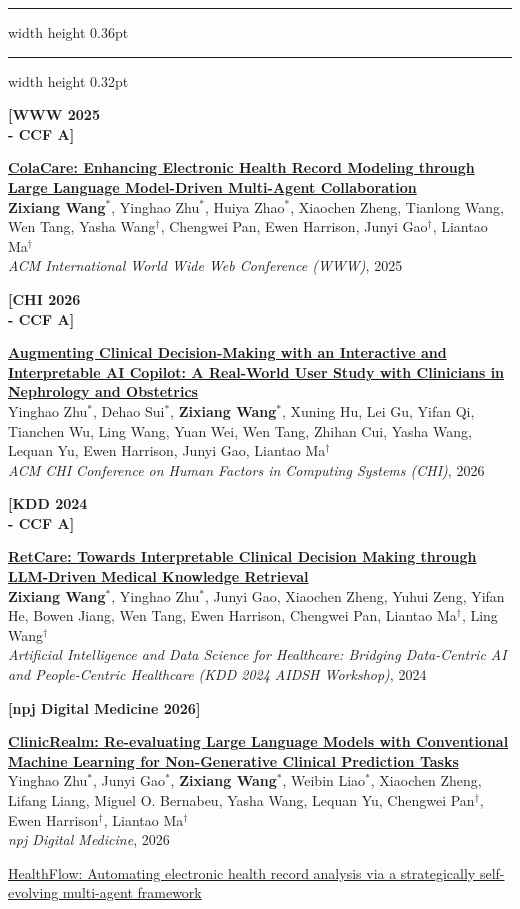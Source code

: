 \documentclass[10pt,a4paper]{article}
\newlength{\pubcategorywidth}
\newcommand{\sectiontitle}[1]{%
    \par\vspace{2.6mm}%
    \noindent{\Large\textbf{#1}}\par
    \vspace{0.9mm}%
    \hrule width \textwidth height 0.36pt
    \vspace{1.85mm}%
}
\newcommand{\pubcategorytitle}[1]{%
    \par\vspace{1.2mm}%
    \settowidth{\pubcategorywidth}{{\normalsize\textbf{#1}}}%
    \noindent{\normalsize\textcolor{darkred}{\textbf{#1}}}\par
    \vspace{0.45mm}%
    {\color{darkred}\hrule width \pubcategorywidth height 0.32pt}
    \vspace{1.45mm}%
}
\newcommand{\pubentry}[5]{
    \noindent
    \begin{minipage}[t]{0.145\textwidth}
    \raggedright\small\textbf{#1}
    \end{minipage}
    \hfill
    \begin{minipage}[t]{0.84\textwidth}
    {\small\textbf{\textcolor{black}{#2}}}\\[-0.1mm]
    {\small #3}\\[-0.1mm]
    {\small\textit{#4}, #5}
    \end{minipage}
    \par\vspace{1.35mm}
}
\begin{document}
\sectiontitle{论文发表 {\normalfont\small ($^{\ast}$ 表示共同一作；$^{\dagger}$ 表示通讯作者)}}
\pubcategorytitle{Core Works}
\pubentry{[WWW 2025\\[-0.1mm]- CCF A]}
{\begingroup\hypersetup{hidelinks}\href{https://dl.acm.org/doi/10.1145/3696410.3714877}{ColaCare: Enhancing Electronic Health Record Modeling through Large Language Model-Driven Multi-Agent Collaboration}\endgroup}
{\textbf{Zixiang Wang}$^{\ast}$, Yinghao Zhu$^{\ast}$, Huiya Zhao$^{\ast}$, Xiaochen Zheng, Tianlong Wang, Wen Tang, Yasha Wang$^{\dagger}$, Chengwei Pan, Ewen Harrison, Junyi Gao$^{\dagger}$, Liantao Ma$^{\dagger}$}
{ACM International World Wide Web Conference (WWW)}
{2025}
\pubentry{[CHI 2026\\[-0.1mm]- CCF A]}
{\begingroup\hypersetup{hidelinks}\href{https://arxiv.org/abs/2602.00726}{Augmenting Clinical Decision-Making with an Interactive and Interpretable AI Copilot: A Real-World User Study with Clinicians in Nephrology and Obstetrics}\endgroup}
{Yinghao Zhu$^{\ast}$, Dehao Sui$^{\ast}$, \textbf{Zixiang Wang}$^{\ast}$, Xuning Hu, Lei Gu, Yifan Qi, Tianchen Wu, Ling Wang, Yuan Wei, Wen Tang, Zhihan Cui, Yasha Wang, Lequan Yu, Ewen Harrison, Junyi Gao, Liantao Ma$^{\dagger}$}
{ACM CHI Conference on Human Factors in Computing Systems (CHI)}
{2026}
\pubentry{[KDD 2024\\[-0.1mm]- CCF A]}
{\begingroup\hypersetup{hidelinks}\href{https://openreview.net/pdf?id=jqo1vk63qE}{RetCare: Towards Interpretable Clinical Decision Making through LLM-Driven Medical Knowledge Retrieval}\endgroup}
{\textbf{Zixiang Wang}$^{\ast}$, Yinghao Zhu$^{\ast}$, Junyi Gao, Xiaochen Zheng, Yuhui Zeng, Yifan He, Bowen Jiang, Wen Tang, Ewen Harrison, Chengwei Pan, Liantao Ma$^{\dagger}$, Ling Wang$^{\dagger}$}
{Artificial Intelligence and Data Science for Healthcare: Bridging Data-Centric AI and People-Centric Healthcare (KDD 2024 AIDSH Workshop)}
{2024}
\pubentry{[npj Digital Medicine 2026]}
{\begingroup\hypersetup{hidelinks}\href{https://www.nature.com/articles/s41746-026-02539-z}{ClinicRealm: Re-evaluating Large Language Models with Conventional Machine Learning for Non-Generative Clinical Prediction Tasks}\endgroup}
{Yinghao Zhu$^{\ast}$, Junyi Gao$^{\ast}$, \textbf{Zixiang Wang}$^{\ast}$, Weibin Liao$^{\ast}$, Xiaochen Zheng, Lifang Liang, Miguel O. Bernabeu, Yasha Wang, Lequan Yu, Chengwei Pan$^{\dagger}$, Ewen Harrison$^{\dagger}$, Liantao Ma$^{\dagger}$}
{npj Digital Medicine}
{2026}
{\begingroup\hypersetup{hidelinks}\href{https://arxiv.org/abs/2508.02621}{HealthFlow: Automating electronic health record
analysis via a strategically self-evolving multi-agent framework}\endgroup}
\end{document}
